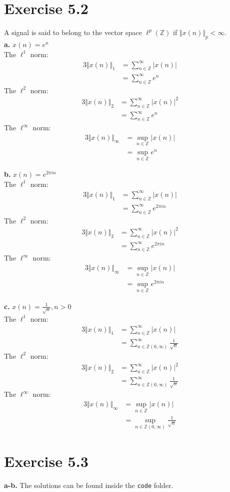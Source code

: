 \documentclass[12pt]{article}
\newcommand{\inte}{\mathbb{Z}}
\begin{document}
	\section*{Exercise 5.2}
	A signal is said to belong to the vector space $\ell^p(\inte)$ if $\Vert x(n)\Vert_p < \infty$.\\
	\textbf{a.} $x(n) = e^n$\\
	The $\ell^1$ norm:
	\begin{alignat*}{3}
	\Vert x(n) \Vert_1 &= \sum_{n \in \inte}^{\infty} \vert x(n) \vert\\
	&= \sum_{n \in \inte}^{\infty} e^n 
	\end{alignat*}
	The $\ell^2$ norm:
	\begin{alignat*}{3}
	\Vert x(n) \Vert_2 &= \sum_{n \in \inte}^{\infty} \vert x(n) \vert^2\\
	&= \sum_{n \in \inte}^{\infty} e^n 
	\end{alignat*}
	The $\ell^\infty$ norm:
	\begin{alignat*}{3}
	\Vert x(n) \Vert_\infty &= \sup_{n \in \inte}\vert x(n) \vert\\
	&=  \sup_{n \in \inte} e^n
	\end{alignat*}
	
	\textbf{b.} $x(n) = e^{2\pi i n}$\\
	The $\ell^1$ norm:
	\begin{alignat*}{3}
	\Vert x(n) \Vert_1 &= \sum_{n \in \inte}^{\infty} \vert x(n) \vert\\
	&= \sum_{n \in \inte}^{\infty} e^{2\pi i n}
	\end{alignat*}
	The $\ell^2$ norm:
	\begin{alignat*}{3}
	\Vert x(n) \Vert_2 &= \sum_{n \in \inte}^{\infty} \vert x(n) \vert^2\\
	&= \sum_{n \in \inte}^{\infty}  e^{2\pi i n} 
	\end{alignat*}
	The $\ell^\infty$ norm:
	\begin{alignat*}{3}
	\Vert x(n) \Vert_\infty &= \sup_{n \in \inte}\vert x(n) \vert\\
	&=  \sup_{n \in \inte} e^{2\pi i n}
	\end{alignat*}
	
	\textbf{c.} $x(n) = \frac{1}{\sqrt{n}}, n > 0$\\
	The $\ell^1$ norm:
	\begin{alignat*}{3}
	\Vert x(n) \Vert_1 &= \sum_{n \in \inte}^{\infty} \vert x(n) \vert\\
	&= \sum_{n \in \inte(0, \infty)}^{\infty} \frac{1}{\sqrt{n}}
	\end{alignat*}
	The $\ell^2$ norm:
	\begin{alignat*}{3}
	\Vert x(n) \Vert_2 &= \sum_{n \in \inte}^{\infty} \vert x(n) \vert^2\\
	&= \sum_{n \in \inte(0, \infty)}^{\infty} \frac{1}{\sqrt{n}}
	\end{alignat*}
	The $\ell^\infty$ norm:
	\begin{alignat*}{3}
	\Vert x(n) \Vert_\infty &= \sup_{n \in \inte}\vert x(n) \vert\\
	&=  \sup_{n \in \inte(0, \infty)} \frac{1}{\sqrt{n}}
	\end{alignat*}
	\section*{Exercise 5.3}
	\textbf{a-b.} The solutions can be found inside the \texttt{code} folder.
\end{document}
